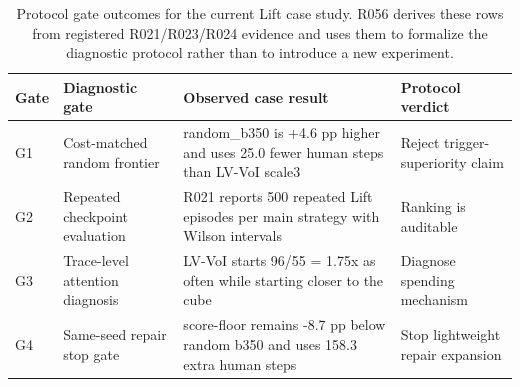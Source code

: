 \begin{table}[t]
\centering
\caption{Protocol gate outcomes for the current Lift case study. R056 derives these rows from registered R021/R023/R024 evidence and uses them to formalize the diagnostic protocol rather than to introduce a new experiment.}
\label{tab:protocol_gate_matrix_r056}
\begin{tabular}{p{}p{}p{}p{}}
\toprule
Gate & Diagnostic gate & Observed case result & Protocol verdict \\
\midrule
G1 & Cost-matched random frontier & random\_b350 is +4.6 pp higher and uses 25.0 fewer human steps than LV-VoI scale3 & Reject trigger-superiority claim \\
G2 & Repeated checkpoint evaluation & R021 reports 500 repeated Lift episodes per main strategy with Wilson intervals & Ranking is auditable \\
G3 & Trace-level attention diagnosis & LV-VoI starts 96/55 = 1.75x as often while starting closer to the cube & Diagnose spending mechanism \\
G4 & Same-seed repair stop gate & score-floor remains -8.7 pp below random b350 and uses 158.3 extra human steps & Stop lightweight repair expansion \\
\bottomrule
\end{tabular}
\end{table}

